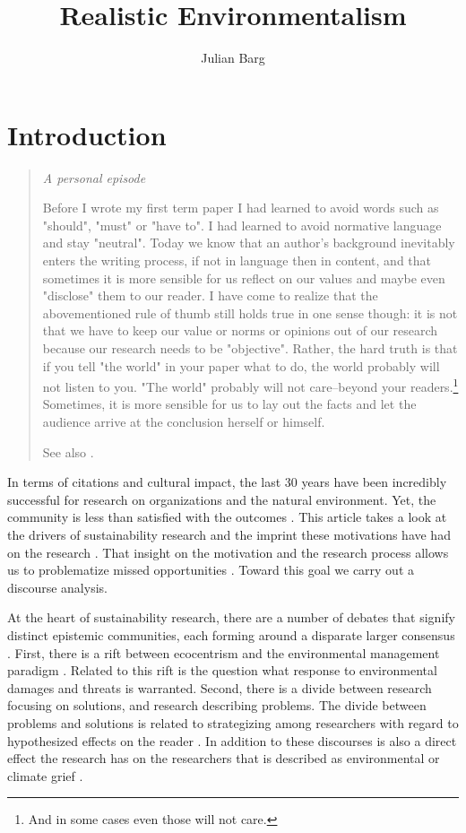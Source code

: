 \documentclass{article}
\title{Realistic Environmentalism}
\author{Julian Barg}
\begin{document}
	\maketitle

	\section*{Introduction}

	\begin{quote}
		\itshape
		A personal episode

		Before I wrote my first term paper I had learned to avoid words such as "should", "must" or "have to". I had learned to avoid normative language and stay "neutral". Today we know that an author's background inevitably enters the writing process, if not in language then in content, and that sometimes it is more sensible for us reflect on our values and maybe even "disclose" them to our reader. I have come to realize that the abovementioned rule of thumb still holds true in one sense though: it is not that we have to keep our value or norms or opinions out of our research because our research needs to be "objective". Rather, the hard truth is that if you tell "the world" in your paper what to do, the world probably will not listen to you. "The world" probably will not care--beyond your readers.\footnote{And in some cases even those will not care.} Sometimes, it is more sensible for us to lay out the facts and let the audience arrive at the conclusion herself or himself.

		See also \citet{Gouldner1962,Zbaracki2021-02-03,Jones2019,Boisot2010}.
	\end{quote}

	In terms of citations and cultural impact, the last 30 years have been incredibly successful for research on organizations and the natural environment. Yet, the community is less than satisfied with the outcomes \cite[e.g.,][]{Ergene2020}. This article takes a look at the drivers of sustainability research and the imprint these motivations have had on the research \citep{Latour1987}. That insight on the motivation and the research process allows us to problematize missed opportunities \citep{Alvesson2011}. Toward this goal we carry out a discourse analysis.

	At the heart of sustainability research, there are a number of debates that signify distinct epistemic communities, each forming around a disparate larger consensus \citep[cf.][]{KnorrCetina2000}. First, there is a rift between ecocentrism and the environmental management paradigm \citep{Purser1995}. Related to this rift is the question what response to environmental damages and threats is warranted. Second, there is a divide between research focusing on solutions, and research describing problems. The divide between problems and solutions is related to strategizing among researchers with regard to hypothesized effects on the reader \citep{Westoby2019}. In addition to these discourses is also a direct effect the research has on the researchers that is described as environmental or climate grief \citep{Conroy2019,Cunsolo2018}.
\end{document}
